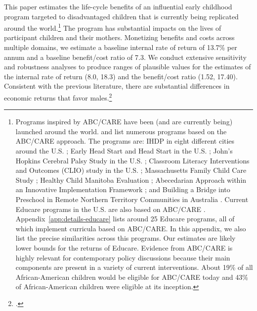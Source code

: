 This paper estimates the life-cycle benefits of an influential early childhood program targeted to disadvantaged children that is currently being replicated around the world.\footnote{Programs inspired by ABC/CARE have been (and are currently being) launched around the world. \citet{Sparling_2010_Highlights} and \citet{Ramey_Ramey_Lanzi_2014_Interventions} list numerous programs based on the ABC/CARE approach. The programs are: IHDP in eight different cities around the U.S. \citep{Spiker-etal_1997_Helping}; Early Head Start and Head Start in the U.S. \citep{Schneider_McDonald-eds_2007_Scale-Up_Vol-1}; John's Hopkins Cerebral Palsy Study in the U.S. \citep{Sparling_2010_Highlights}; Classroom Literacy Interventions and Outcomes (CLIO) study in the U.S. \citep{Sparling_2010_Highlights}; Massachusetts Family Child Care Study \citep{Collins_etal_2010_Massachusetts-Study}; Healthy Child Manitoba Evaluation \citep{Healthy_Child_Manitoba_2015_Starting-Early}; Abecedarian Approach within an Innovative Implementation Framework \citep{Jensen_Nielsen_2016_ABC-Programme-Pilot}; and Building a Bridge into Preschool in Remote Northern Territory Communities in Australia \citep{UMonash_Dataset_2015_URL}. Current Educare programs in the U.S. are also based on ABC/CARE \citep{Educare_2014_Research_Agenda,Yazejian_Bryant_2012_Educare}. Appendix~\ref{app:details-educare} lists around 25 Educare programs, all of which implement curricula based on ABC/CARE. In this appendix, we also list the precise similarities across this programs. Our estimates are likely lower bounds for the returns of Educare. Evidence from ABC/CARE is highly relevant for contemporary policy discussions because their main components are present in a variety of current interventions. About 19\% of all African-American children would be eligible for ABC/CARE today and 43\% of African-American children were eligible at its inception.} The program has substantial impacts on the lives of  participant children and their mothers. Monetizing benefits and costs across multiple domains, we estimate a baseline internal rate of return of 13.7\% per annum and a baseline benefit/cost ratio of 7.3. We conduct extensive sensitivity and robustness analyses to produce ranges of plausible values for the estimates of the internal rate of return (8.0, 18.3) and the benefit/cost ratio (1.52, 17.40). Consistent with the previous literature, there are substantial differences in economic returns that favor males.\footnote{\cite{Garcia_Heckman_Ziff_2017_Gender-Diff_UNPUBLISHED}.}

